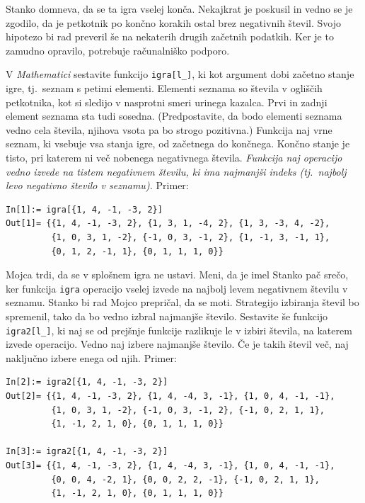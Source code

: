 \documentclass[arhiv]{../izpit}
\begin{document}
\noindent Stanko domneva, da se ta igra vselej konča. Nekajkrat je poskusil in vedno se je zgodilo, da je petkotnik po končno korakih ostal brez negativnih števil.
Svojo hipotezo bi rad preveril še na nekaterih drugih začetnih podatkih. Ker je to zamudno opravilo, potrebuje računalniško podporo.

\podnaloga[20 točk]
V \emph{Mathematici} sestavite funkcijo \texttt{igra[l\_]}, ki kot argument dobi začetno stanje igre, tj.\ seznam s petimi elementi. Elementi seznama so števila v ogliščih petkotnika, kot si sledijo v nasprotni smeri urinega kazalca. Prvi in zadnji element seznama sta tudi sosedna. (Predpostavite, da bodo elementi seznama vedno cela števila, njihova vsota pa bo strogo pozitivna.) Funkcija naj vrne seznam, ki vsebuje vsa stanja igre, od začetnega do končnega. Končno stanje je tisto, pri katerem ni več nobenega negativnega števila. \emph{Funkcija naj operacijo vedno izvede na tistem negativnem številu, ki ima najmanjši indeks (tj.\ najbolj levo negativno število v seznamu).} Primer:
%
\begin{verbatim}
In[1]:= igra[{1, 4, -1, -3, 2}]
Out[1]= {{1, 4, -1, -3, 2}, {1, 3, 1, -4, 2}, {1, 3, -3, 4, -2},
         {1, 0, 3, 1, -2}, {-1, 0, 3, -1, 2}, {1, -1, 3, -1, 1},
         {0, 1, 2, -1, 1}, {0, 1, 1, 1, 0}}
\end{verbatim}


\podnaloga[10 točk]
Mojca trdi, da se v splošnem igra ne ustavi. Meni, da je imel Stanko pač srečo, ker funkcija \texttt{igra} operacijo vselej izvede na najbolj levem negativnem številu v seznamu. Stanko bi rad Mojco prepričal, da se moti. Strategijo izbiranja števil bo spremenil, tako da bo vedno izbral najmanjše število. Sestavite še funkcijo \texttt{igra2[l\_]}, ki naj se od prejšnje funkcije razlikuje le v izbiri števila, na katerem izvede operacijo. Vedno naj izbere najmanjše število. Če je takih števil več, naj naključno izbere enega od njih. Primer:
%
\begin{verbatim}
In[2]:= igra2[{1, 4, -1, -3, 2}]
Out[2]= {{1, 4, -1, -3, 2}, {1, 4, -4, 3, -1}, {1, 0, 4, -1, -1},
         {1, 0, 3, 1, -2}, {-1, 0, 3, -1, 2}, {-1, 0, 2, 1, 1},
         {1, -1, 2, 1, 0}, {0, 1, 1, 1, 0}}
         
In[3]:= igra2[{1, 4, -1, -3, 2}]
Out[3]= {{1, 4, -1, -3, 2}, {1, 4, -4, 3, -1}, {1, 0, 4, -1, -1},
         {0, 0, 4, -2, 1}, {0, 0, 2, 2, -1}, {-1, 0, 2, 1, 1},
         {1, -1, 2, 1, 0}, {0, 1, 1, 1, 0}}
\end{verbatim}
\end{document}
